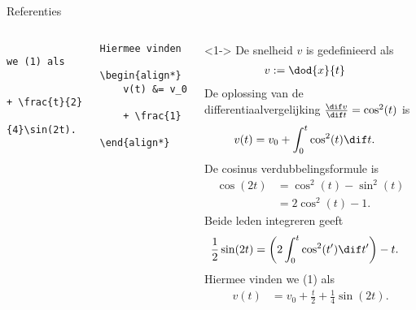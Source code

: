 \begin{frame}[fragile,t]{Referenties}
\begin{columns}[t]
\begin{column}{0.5\textwidth}
\begin{verbatim}
                Hiermee vinden we (1) als
                \begin{align*}
                    v(t) &= v_0 + \frac{t}{2}
                    + \frac{1}{4}\sin(2t).
                \end{align*}
            \end{verbatim}
        \end{column}
        \begin{column}{0.5\textwidth}
            \begin{adjustbox}{frame=1pt 10pt,valign=t}%
                \begin{minipage}{\textwidth-22pt}
                    \begin{onlyenv}<1->%
                        {\tiny\setlength{\abovedisplayskip}{3pt}%
                            \setlength{\belowdisplayskip}{3pt}%
                            \setlength{\abovedisplayshortskip}{0pt}%
                            \setlength{\belowdisplayshortskip}{0pt}%
                            \setcounter{equation}{0}%
                            De snelheid $ v $ is gedefinieerd als
                            \begin{align}
                                v &:= \dod{x}{t}
                            \end{align}
                            De oplossing van de differentiaalvergelijking $ \frac{\dif v}{\dif t} = \cos^2(t) $ is
                            \begin{align}
                                v(t) & = v_0 + \int_{0}^{t}\cos^2(t)\dif t.
                            \end{align}
                            De cosinus verdubbelingsformule is
                            \begin{align*}
                                \cos(2t) & = \cos^2(t) - \sin^2(t) \\
                                         & = 2\cos^2(t)-1.
                            \end{align*}
                            Beide leden integreren geeft
                            \begin{align*}
                                \frac{1}{2}\sin(2t) & = \left(2\int_0^t\cos^2(t')\dif t'\right) - t.
                            \end{align*}
                            Hiermee vinden we (1) als
                            \begin{align*}
                                v(t) & = v_0 + \frac{t}{2} + \frac{1}{4}\sin(2t).
                            \end{align*}
                        }%
                    \end{onlyenv}%
                \end{minipage}
            \end{adjustbox}
        \end{column}
    \end{columns}
\end{frame}
\fi


